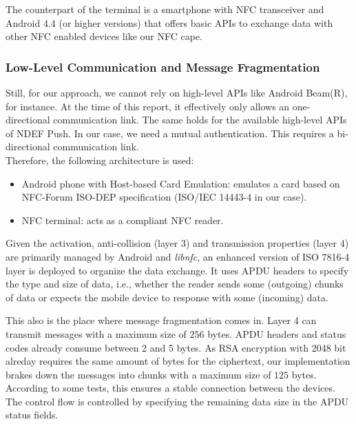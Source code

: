 The counterpart of the terminal is a smartphone with NFC transceiver and Android 4.4 (or higher versions) that offers basic APIs to exchange data with other NFC enabled devices like our NFC cape.

\subsubsection{Low-Level Communication and Message Fragmentation}
Still, for our approach, we cannot rely on high-level APIs like Android Beam(R), for instance.
At the time of this report, it effectively only allows an one-directional communication link. The same holds for the available high-level APIs of NDEF Push.
In our case, we need a mutual authentication. This requires a bi-directional communication link.
\\
Therefore, the following architecture is used:
\begin{itemize}
	\item Android phone with Host-based Card Emulation: emulates a card based on NFC-Forum ISO-DEP specification (ISO/IEC 14443-4 in our case).
	\item NFC terminal: acts as a compliant NFC reader.
\end{itemize}
%
Given the activation, anti-collision (layer 3) and transmission properties (layer 4) are primarily managed by Android and \textit{libnfc}, an enhanced version of ISO 7816-4 layer is deployed to organize the data exchange.
It uses APDU headers to specify the type and size of data, i.e., whether the reader sends some (outgoing) chunks of data or expects the mobile device to response with some (incoming) data.

This also is the place where message fragmentation comes in.
Layer 4 can transmit messages with a maximum size of $256$ bytes.
APDU headers and status codes already consume between 2 and 5 bytes. As RSA encryption with 2048 bit alreday requires the same amount of bytes for the ciphertext, our implementation brakes down the messages into chunks with a maximum size of $125$ bytes.
According to some tests, this ensures a stable connection between the devices.
The control flow is controlled by specifying the remaining data size in the APDU status fields.

